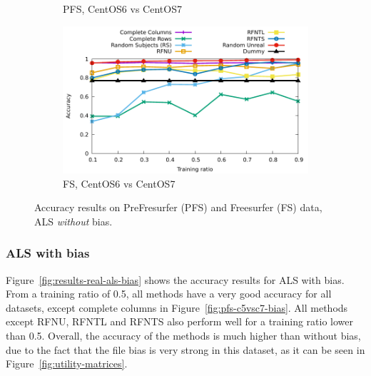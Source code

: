 \documentclass[10pt, conference, compsocconf]{IEEEtran}
\begin{document}
\begin{figure}
\begin{subfigure}[b]{\columnwidth}
        \caption{PFS, CentOS6 vs CentOS7}
\end{subfigure}\hfill
\begin{subfigure}[b]{\columnwidth}
        \includegraphics[width=0.8\columnwidth]{data/results/means_of_results/ALS/FS-100files/ALS-FS100files.pdf}
        \caption{FS, CentOS6 vs CentOS7}
\end{subfigure}
\caption{Accuracy results on PreFresurfer (PFS) and Freesurfer (FS) data, ALS \emph{without} bias.}
\label{fig:results-real-als}
\end{figure}

\subsubsection{ALS with bias}

Figure~\ref{fig:results-real-als-bias} shows the accuracy results for 
ALS with bias. From a training ratio of 0.5, all methods have a very 
good accuracy for all datasets, except complete columns in 
Figure~\ref{fig:pfs-c5vsc7-bias}. All methods except RFNU, RFNTL and 
RFNTS also perform well for a training ratio lower than 0.5. Overall, 
the accuracy of the methods is much higher than without bias, due to 
the fact that the file bias is very strong in this dataset, as 
it can be seen in Figure~\ref{fig:utility-matrices}.
\end{document}

